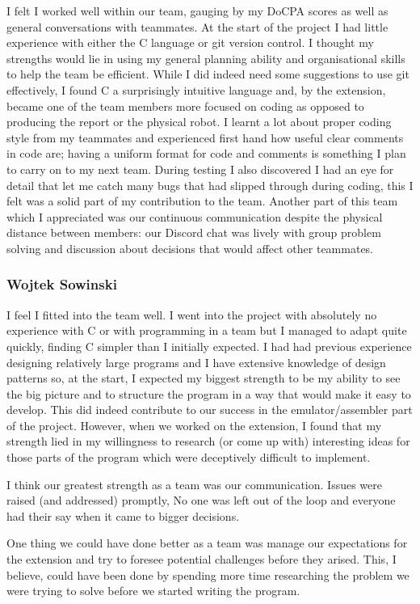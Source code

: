 \documentclass[8pt]{article}
\begin{document}
I felt I worked well within our team, gauging by my DoCPA scores as well as general conversations 
with teammates. At the start of the project I had little experience with either the C language or 
git version control. I thought my strengths would lie in using my general planning ability and 
organisational skills to help the team be efficient. While I did indeed need some suggestions to use
 git effectively, I found C a surprisingly intuitive language and, by the extension, became one of
the team members more focused on coding as opposed to producing the report or the physical robot.
I learnt a lot about proper coding style from my teammates and experienced first hand how useful 
clear comments in code are; having a uniform format for code and comments is something I plan to carry
on to my next team. During testing I also discovered I had an eye for detail that let me catch many 
bugs that had slipped through during coding, this I felt was a solid part of my contribution 
to the team.
Another part of this team which I appreciated was our continuous communication despite the physical 
distance between members: our Discord chat was lively with group problem solving and discussion 
about decisions that would affect other teammates.

\subsubsection{Wojtek Sowinski}

I feel I fitted into the team well. I went into the project with absolutely no experience with C
or with programming in a team but I managed to adapt quite quickly, finding C simpler than I
initially expected. I had had previous experience designing relatively large programs and I have
extensive knowledge of design patterns so, at the start, I expected my biggest strength to be my 
ability to see the big picture and to structure the program in a way that would make it easy to
develop. This did indeed contribute to our success in the emulator/assembler part of the project.
However, when we worked on the extension, I found that my strength lied in my willingness to 
research (or come up with) interesting ideas for those parts of the program which were deceptively
difficult to implement.

I think our greatest strength as a team was our communication. Issues were raised (and addressed)
promptly, No one was left out of the loop and everyone had their say when it came to bigger decisions.

One thing we could have done better as a team was manage our expectations for the extension and try to
foresee potential challenges before they arised. This, I believe, could have been done by 
spending more time researching the problem we were trying to solve before we started writing the
program.
\end{document}
